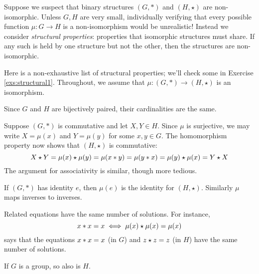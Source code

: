 
Suppose we suspect that binary structures $(G,*)$ and $(H,\star)$ are non-isomorphic. Unless $G,H$ are very small, individually verifying that every possible function $\mu:G\to H$ is a non-isomorphism would be unrealistic! Instead we consider \emph{structural properties}: properties that isomorphic structures must share. If any such is held by one structure but not the other, then the structures are non-isomorphic.\smallbreak

Here is a non-exhaustive list of structural properties; we'll check some in Exercise \ref{exs:structural1}. Throughout, we assume that $\mu:(G,*)\to (H,\star)$ is an isomorphism. 
\begin{description}\itemsep0pt
  \item[\emph{Cardinality/order}:] Since $G$ and $H$ are bijectively paired, their cardinalities are the same.
  \item[\emph{Commutativity \& Associativity}:] Suppose $(G,\ast)$ is commutative and let $X,Y\in H$. Since $\mu$ is surjective, we may write $X=\mu(x)$ and $Y=\mu(y)$ for some $x,y\in G$. The homomorphism property now shows that $(H,\star)$ is commutative:
  \[
  	X\mathbin{\star} Y=\mu(x)\mathbin{\star}\mu(y) =\mu(x\mathbin{\ast} y) =\mu(y\mathbin{\ast} x) =\mu(y)\mathbin{\star}\mu(x) =Y\mathbin{\star} X
  \]
  The argument for associativity is similar, though more tedious.
  \item[\emph{Identities \& Inverses}:] If $(G,\ast)$ has identity $e$, then $\mu(e)$ is the identity for $(H,\star)$. Similarly $\mu$ maps inverses to inverses.
  \item[\emph{Solutions to equations}:] Related equations have the same number of solutions. For instance,
  \[
  	x\mathbin{\ast} x=x\iff \mu(x)\mathbin{\star}\mu(x)=\mu(x)
  \]
  says that the equations $x\mathbin{\ast} x=x$ (in $G$) and $z\mathbin{\star} z=z$ (in $H$) have the same number of solutions.\footnotemark
  \item[\emph{Being a group}] If $G$ is a group, so also is $H$.
\end{description}




